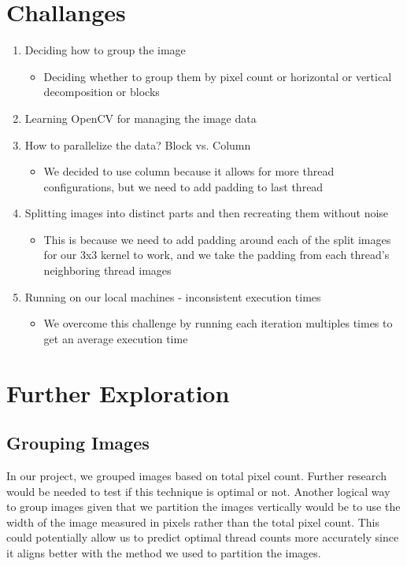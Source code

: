 \documentclass{article}
\begin{document}
\section{Challanges}
\begin{enumerate}
  \item Deciding how to group the image
  \begin{itemize}
     \item Deciding whether to group them by pixel count or horizontal or vertical decomposition or blocks
   \end{itemize}
  \item Learning OpenCV for managing the image data
  \item How to parallelize the data? Block vs. Column
  \begin{itemize}
     \item We decided to use column because it allows for more thread configurations, but we need to add padding to last thread
   \end{itemize}
   \item Splitting images into distinct parts and then recreating them without noise
   \begin{itemize}
     \item This is because we need to add padding around each of the split images for our 3x3 kernel to work, and we take the padding from each thread's neighboring thread images
   \end{itemize}
   \item Running on our local machines - inconsistent execution times
   \begin{itemize}
     \item We overcome this challenge by running each iteration multiples times to get an average execution time
   \end{itemize}
\end{enumerate}
        
\section{Further Exploration}
    \subsection{Grouping Images}
    In our project, we grouped images based on total pixel count. Further research would be needed to test if this technique is optimal or not. Another logical way to group images given that we partition the images vertically would be to use the width of the image measured in pixels rather than the total pixel count. This could potentially allow us to predict optimal thread counts more accurately since it aligns better with the method we used to partition the images.
    
\end{document}
